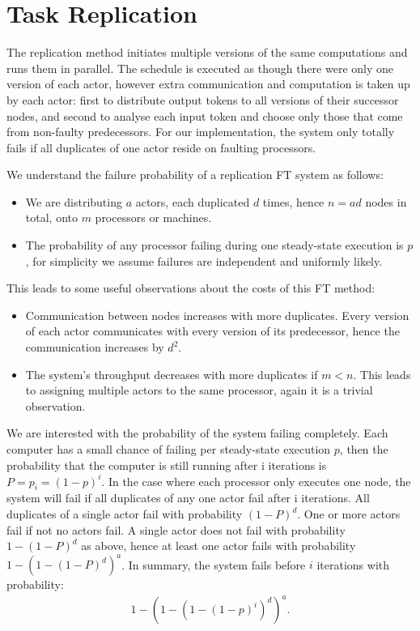 \section{Task Replication}

The replication method initiates multiple versions of the same computations and runs them in parallel.
The schedule is executed as though there were only one version of each actor, however extra communication and computation is taken up by each actor: first to distribute output tokens to all versions of their successor nodes, and second to analyse each input token and choose only those that come from non-faulty predecessors.
For our implementation, the system only totally fails if all duplicates of one actor reside on faulting processors.

We understand the failure probability of a replication FT system as follows:
\begin{itemize}
	\item We are distributing $a$ actors, each duplicated $d$ times, hence $n = ad$ nodes in total, onto $m$ processors or machines.
	\item The probability of any processor failing during one steady-state execution is $p$, for simplicity we assume failures are independent and uniformly likely.
\end{itemize}

This leads to some useful observations about the costs of this FT method:
\begin{itemize}
	\item Communication between nodes increases with more duplicates.
			Every version of each actor communicates with every version of its predecessor, hence the communication increases by $d^2$.
	\item The system's throughput decreases with more duplicates if $m < n$.
			This leads to assigning multiple actors to the same processor, again it is a trivial observation.
\end{itemize}

We are interested with the probability of the system failing completely.
Each computer has a small chance of failing per steady-state execution $p$, then the probability that the computer is still running after i iterations is $P = p_i = (1-p)^i$.
In the case where each processor only executes one node, the system will fail if all duplicates of any one actor fail after i iterations.
All duplicates of a single actor fail with probability $(1-P)^d$.
One or more actors fail if not no actors fail.
A single actor does not fail with probability $1-(1-P)^d$ as above, hence at least one actor fails with probability $1-(1-(1-P)^d)^a$.
In summary, the system fails before $i$ iterations with probability:
\begin{align}
	\nonumber 1-(1-(1-(1-p)^i)^d)^a.
\end{align}

